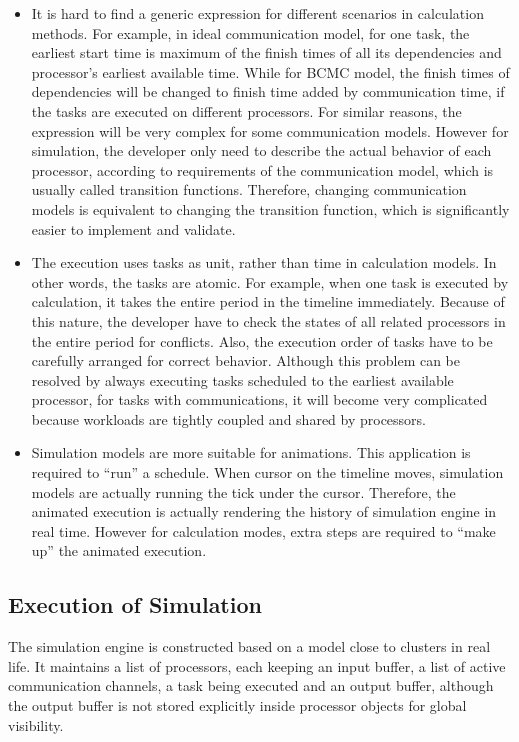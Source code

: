 \documentclass[msc,deptreport, cs]{infthesis}
\begin{document}
\begin{itemize}
  \item It is hard to find a generic expression for different scenarios in calculation methods. For example, in ideal communication model, for one task, the earliest start time is maximum of the finish times of all its dependencies and processor's earliest available time. While for BCMC model, the finish times of dependencies will be changed to finish time added by communication time, if the tasks are executed on different processors. For similar reasons, the expression will be very complex for some communication models. However for simulation, the developer only need to describe the actual behavior of each processor, according to requirements of the communication model, which is usually called transition functions. Therefore, changing communication models is equivalent to changing the transition function, which is significantly easier to implement and validate.
  \item The execution uses tasks as unit, rather than time in calculation models. In other words, the tasks are atomic. For example, when one task is executed by calculation, it takes the entire period in the timeline immediately. Because of this nature, the developer have to check the states of all related processors in the entire period for conflicts. Also, the execution order of tasks have to be carefully arranged for correct behavior. Although this problem can be resolved by always executing tasks scheduled to the earliest available processor, for tasks with communications, it will become very complicated because workloads are tightly coupled and shared by processors.
  \item Simulation models are more suitable for animations. This application is required to ``run'' a schedule. When cursor on the timeline moves, simulation models are actually running the tick under the cursor. Therefore, the animated execution is actually rendering the history of simulation engine in real time. However for calculation modes, extra steps are required to ``make up'' the animated execution.
\end{itemize}

\subsection{Execution of Simulation} \label{sec:simulation}

The simulation engine is constructed based on a model close to clusters in real life. It maintains a list of processors, each keeping an input buffer, a list of active communication channels, a task being executed and an output buffer, although the output buffer is not stored explicitly inside processor objects for global visibility.
\end{document}
